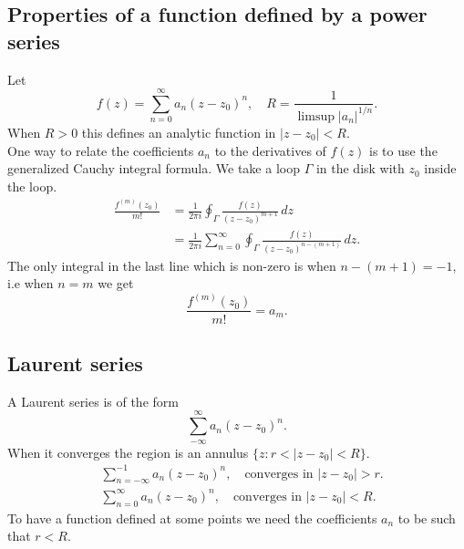 \documentclass{article}
\begin{document}
\subsection{Properties of a function defined by a power series}
Let
\begin{equation}
    f(z) = \sum_{n=0}^\infty a_n(z-z_0)^n,\quad R=\frac{1}{\limsup \vert a_n\vert^{1/n}}.
\end{equation}
When $R>0$ this defines an analytic function in $\vert z-z_0\vert<R$. \\
One way to relate the coefficients $a_n$ to the derivatives of $f(z)$ is to use the generalized Cauchy integral formula. We take a loop $\Gamma$ in the disk with $z_0$ inside the loop.
\begin{align}
    \frac{f^{(m)}(z_0)}{m!} &= \frac{1}{2\pi i}\oint_\Gamma \frac{f(z)}{(z-z_0)^{m+1}}\,dz \\
    &= \frac{1}{2\pi i} \sum_{n=0}^\infty \oint_\Gamma \frac{f(z)}{(z-z_0)^{n-(m+1)}}\,dz.
\end{align}
The only integral in the last line which is non-zero is when $n-(m+1) = -1$, i.e when $n=m$ we get
\begin{equation}
    \frac{f^{(m)}(z_0)}{m!} = a_m.
\end{equation}

\subsection{Laurent series}
A Laurent series is of the form 
\begin{equation}
    \sum_{-\infty}^\infty a_n(z-z_0)^n.    
\end{equation}
When it converges the region is an annulus $\{ z:r<\vert z - z_0\vert <R \}$.
\begin{align}
    &\sum_{n=-\infty}^{-1} a_n(z-z_0)^n,\quad \text{converges in }\vert z-z_0\vert >r. \\
    &\sum_{n=0}^{\infty} a_n(z-z_0)^n,\quad \text{converges in }\vert z-z_0\vert <R.
\end{align}
To have a function defined at some points we need the coefficients $a_n$ to be such that $r<R$.
\end{document}
